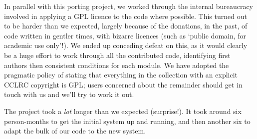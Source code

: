 \documentclass[11pt,twoside]{article}
\begin{document}
In parallel with this porting project, we worked through the internal
bureaucracy involved in applying a GPL licence to the code where
possible.  This turned out to be harder than we expected, largely
because of the donations, in the past, of code written in gentler
times, with bizarre licences (such as `public domain, for academic use
only'!).  We ended up conceding defeat on this, as it would clearly be
a huge effort to work through all the contributed code, identifying
first authors then consistent conditions for each module.  We have
adopted the pragmatic policy of stating that everything in the
collection with an explicit CCLRC copyright is GPL; users concerned
about the remainder should get in touch with us and we'll try to work
it out.

The project took a \emph{lot} longer than we expected (surprise!).  It
took around six person-months to get the initial system up and
running, and then another six to adapt the bulk of our code to the new
system.
\end{document}
